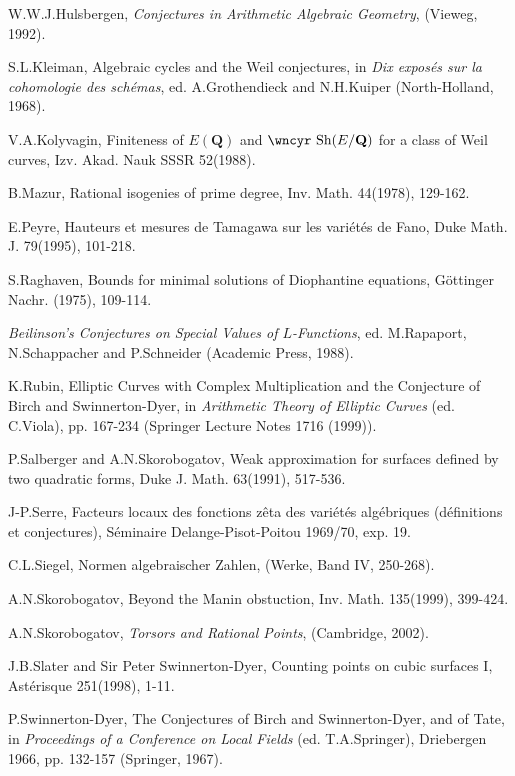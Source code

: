 \documentclass[12pt]{article}
\def\bQ{{\mathbf Q}}
\def\Sha{\mbox{\wncyr Sh}}
\begin{document}
\noindent [22] W.W.J.Hulsbergen, \textit{Conjectures in Arithmetic
Algebraic Geometry}, (Vieweg, 1992).

\noindent [23] S.L.Kleiman, Algebraic cycles and the Weil conjectures,
in \textit{Dix expos\'{e}s sur la cohomologie des sch\'{e}mas},
ed. A.Grothendieck and N.H.Kuiper (North-Holland, 1968).

\noindent [24] V.A.Kolyvagin, Finiteness of $E(\bQ)$ and $\Sha(E/\bQ)$
for a class of Weil curves, Izv. Akad. Nauk SSSR 52(1988).

\noindent [25] B.Mazur, Rational isogenies of prime degree, Inv. Math.
44(1978), 129-162.

\noindent [26] E.Peyre, Hauteurs et mesures de Tamagawa sur les
vari\'{e}t\'{e}s de Fano, Duke Math. J. 79(1995), 101-218.

\noindent [27] S.Raghaven, Bounds for minimal solutions of Diophantine
equations, G\"{o}ttinger Nachr. (1975), 109-114.

\noindent [28] \textit{Beilinson's Conjectures on Special Values of
$L$-Functions}, ed. M.Rapaport, N.Schappacher and P.Schneider (Academic
Press, 1988).

\noindent [29] K.Rubin, Elliptic Curves with Complex Multiplication and
the Conjecture of Birch and Swinnerton-Dyer, in \textit{Arithmetic Theory
of Elliptic Curves} (ed. C.Viola), pp. 167-234 (Springer Lecture Notes
1716 (1999)).

\noindent [30] P.Salberger and A.N.Skorobogatov, Weak approximation for
surfaces defined by two quadratic forms, Duke J. Math. 63(1991), 517-536.

\noindent [31] J-P.Serre, Facteurs locaux des fonctions z\^{e}ta des
vari\'{e}t\'{e}s alg\'{e}briques (d\'{e}finitions et conjectures),
S\'{e}minaire Delange-Pisot-Poitou 1969/70, exp. 19.

\noindent [32] C.L.Siegel, Normen algebraischer Zahlen, (Werke, Band IV,
250-268).

\noindent [33] A.N.Skorobogatov, Beyond the Manin obstuction, Inv. Math.
135(1999), 399-424.

\noindent [34] A.N.Skorobogatov, \textit{Torsors and Rational Points},
(Cambridge, 2002).

\noindent [35] J.B.Slater and Sir Peter Swinnerton-Dyer, Counting points on
cubic surfaces I, Ast\'{e}risque 251(1998), 1-11.

\noindent [36] P.Swinnerton-Dyer, The Conjectures of Birch and
Swinnerton-Dyer, and of Tate, in \textit{Proceedings of a Conference on Local
Fields} (ed. T.A.Springer), Driebergen 1966, pp. 132-157 (Springer, 1967).
\end{document}
